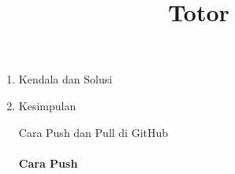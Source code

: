 
\begin{enumerate}
\item Kendala dan Solusi

\item Kesimpulan

\title{Totor} Cara Push dan Pull di GitHub
\paragraph*{Cara Push}
\end{enumerate}

